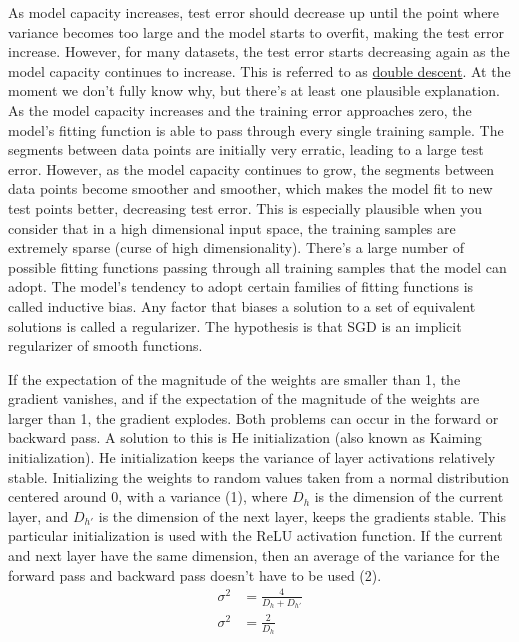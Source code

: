 \documentclass{article}
\begin{document}
As model capacity increases, test error should decrease up until the point where variance becomes too large and the model starts to overfit, making the test error increase. However, for many datasets, the test error starts decreasing again as the model capacity continues to increase. This is referred to as \href{https://www.lesswrong.com/posts/FRv7ryoqtvSuqBxuT/understanding-deep-double-descent}{double descent}. At the moment we don't fully know why, but there's at least one plausible explanation. As the model capacity increases and the training error approaches zero, the model's fitting function is able to pass through every single training sample. The segments between data points are initially very erratic, leading to a large test error. However, as the model capacity continues to grow, the segments between data points become smoother and smoother, which makes the model fit to new test points better, decreasing test error. This is especially plausible when you consider that in a high dimensional input space, the training samples are extremely sparse (curse of high dimensionality). There's a large number of possible fitting functions passing through all training samples that the model can adopt. The model's tendency to adopt certain families of fitting functions is called inductive bias. Any factor that biases a solution to a set of equivalent solutions is called a regularizer. The hypothesis is that SGD is an implicit regularizer of smooth functions.

If the expectation of the magnitude of the weights are smaller than 1, the gradient vanishes, and if the expectation of the magnitude of the weights are larger than 1, the gradient explodes. Both problems can occur in the forward or backward pass. A solution to this is He initialization (also known as Kaiming initialization). He initialization keeps the variance of layer activations relatively stable. Initializing the weights to random values taken from a normal distribution centered around 0, with a variance (1), where $D_h$ is the dimension of the current layer, and $D_{h'}$ is the dimension of the next layer, keeps the gradients stable. This particular initialization is used with the ReLU activation function. If the current and next layer have the same dimension, then an average of the variance for the forward pass and backward pass doesn't have to be used (2).
\begin{align*}
\sigma^2 &= \frac{4}{D_h + D_{h'}}\tag{1}\\
\sigma^2 &= \frac{2}{D_h}\tag{2}
\end{align*}
\end{document}
